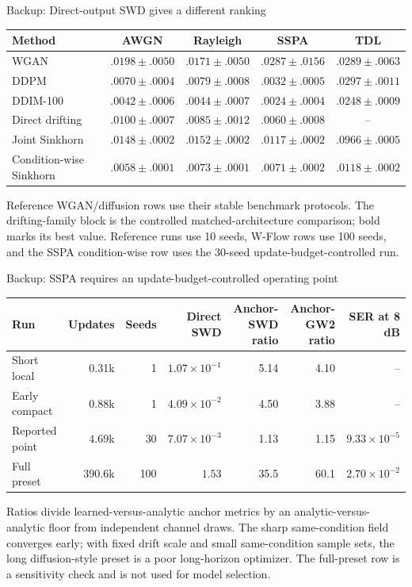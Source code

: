 \documentclass[aspectratio=169,10pt]{beamer}
\begin{document}
\begin{frame}{Backup: Direct-output SWD gives a different ranking}
\scriptsize
\centering
\renewcommand{\arraystretch}{1.25}
\begin{tabular}{lcccc}
\toprule
Method & AWGN & Rayleigh & SSPA & TDL\\
\midrule
WGAN & $.0198\pm.0050$ & $.0171\pm.0050$ & $.0287\pm.0156$ & $.0289\pm.0063$\\
DDPM & $.0070\pm.0004$ & $.0079\pm.0008$ & $.0032\pm.0005$ & $.0297\pm.0011$\\
DDIM-100 & $.0042\pm.0006$ & $.0044\pm.0007$ & $.0024\pm.0004$ & $.0248\pm.0009$\\
\midrule
Direct drifting & $.0100\pm.0007$ & $.0085\pm.0012$ & $\mathbf{.0060\pm.0008}$ & --\\
Joint Sinkhorn & $.0148\pm.0002$ & $.0152\pm.0002$ & $.0117\pm.0002$ & $.0966\pm.0005$\\
Condition-wise Sinkhorn & $\mathbf{.0058\pm.0001}$ & $\mathbf{.0073\pm.0001}$ & $.0071\pm.0002$ & $\mathbf{.0118\pm.0002}$\\
\bottomrule
\end{tabular}
\vspace{0.45cm}
\begin{minipage}{0.9\textwidth}
\small Reference WGAN/diffusion rows use their stable benchmark protocols. The drifting-family block is the controlled matched-architecture comparison; bold marks its best value. Reference runs use 10 seeds, W-Flow rows use 100 seeds, and the SSPA condition-wise row uses the 30-seed update-budget-controlled run.
\end{minipage}
\end{frame}

\begin{frame}{Backup: SSPA requires an update-budget-controlled operating point}
\scriptsize
\centering
\renewcommand{\arraystretch}{1.3}
\begin{tabular}{lrrrrrr}
\toprule
Run & Updates & Seeds & Direct SWD & Anchor-SWD ratio & Anchor-GW2 ratio & SER at 8 dB\\
\midrule
Short local & 0.31k & 1 & $1.07\!\times\!10^{-1}$ & 5.14 & 4.10 & --\\
Early compact & 0.88k & 1 & $4.09\!\times\!10^{-2}$ & 4.50 & 3.88 & --\\
Reported point & 4.69k & 30 & $7.07\!\times\!10^{-3}$ & 1.13 & 1.15 & $9.33\!\times\!10^{-5}$\\
Full preset & 390.6k & 100 & $1.53$ & 35.5 & 60.1 & $2.70\!\times\!10^{-2}$\\
\bottomrule
\end{tabular}
\vspace{0.45cm}
\begin{minipage}{0.92\textwidth}
\small Ratios divide learned-versus-analytic anchor metrics by an analytic-versus-analytic floor from independent channel draws. The sharp same-condition field converges early; with fixed drift scale and small same-condition sample sets, the long diffusion-style preset is a poor long-horizon optimizer. The full-preset row is a sensitivity check and is not used for model selection.
\end{minipage}
\end{frame}
\end{document}
